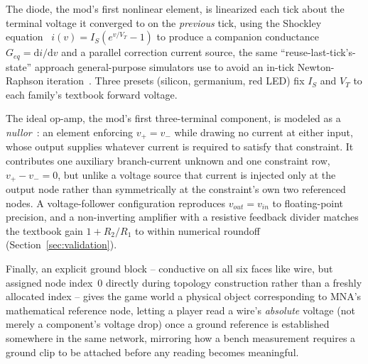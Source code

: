 The diode, the mod's first nonlinear element, is linearized each tick about the terminal
voltage it converged to on the \emph{previous} tick, using the Shockley
equation~\cite{shockley1949diode} $i(v)=I_S(e^{v/V_T}-1)$ to produce a companion conductance
$G_{eq}=\mathrm{d}i/\mathrm{d}v$ and a parallel correction current source, the same
``reuse-last-tick's-state'' approach general-purpose simulators use to avoid an
in-tick Newton-Raphson iteration~\cite{massobrio1993spice}. Three presets (silicon,
germanium, red LED) fix $I_S$ and $V_T$ to each family's textbook forward voltage.

The ideal op-amp, the mod's first three-terminal component, is modeled as a
\emph{nullor}~\cite{chualin1975nullor}: an element enforcing $v_{+}=v_{-}$ while drawing no
current at either input, whose output supplies whatever current is required to satisfy that
constraint. It contributes one auxiliary branch-current unknown and one constraint row,
$v_{+}-v_{-}=0$, but unlike a voltage source that current is injected only at the output node
rather than symmetrically at the constraint's own two referenced nodes. A voltage-follower
configuration reproduces $v_{out}=v_{in}$ to floating-point precision, and a non-inverting
amplifier with a resistive feedback divider matches the textbook gain $1+R_2/R_1$ to within
numerical roundoff (Section~\ref{sec:validation}).

Finally, an explicit ground block -- conductive on all six faces like wire, but assigned node
index~0 directly during topology construction rather than a freshly allocated index -- gives
the game world a physical object corresponding to MNA's mathematical reference node, letting a
player read a wire's \emph{absolute} voltage (not merely a component's voltage drop) once a
ground reference is established somewhere in the same network, mirroring how a bench
measurement requires a ground clip to be attached before any reading becomes meaningful.
